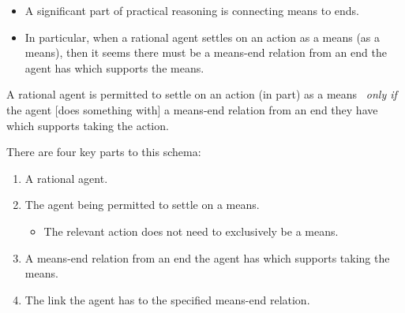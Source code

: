 \documentclass[10pt]{article}
\newenvironment{beamerblock}[1]{%
  \tcolorbox[standard,%
  no shadow,
  noparskip,
  colback=white,
  colframe=black,
  colbacktitle=white,
  coltitle=black,
  colupper=black,
  size=small,
  boxrule=.125mm,
  fonttitle=\bfseries,
  sharp corners=all,
  title=#1]}%
{\endtcolorbox}
\begin{document}
\begin{itemize}
\item A significant part of practical reasoning is connecting means to ends.
\item In particular, when a rational agent settles on an action as a means (as a means), then it seems there must be a means-end relation from an end the agent has which supports the means.
\end{itemize}

\begin{beamerblock}{Means-end schema}
  A rational agent is permitted to settle on an action (in part) as a means
  \newline
  \mbox{ }\hfill\emph{only if}\hfill\mbox{ }
  \newline
  the agent [{does something with}] a means-end relation from an end they have which supports taking the action.
\end{beamerblock}

There are four key parts to this schema:
\begin{enumerate}[label=\arabic*., ref=(\arabic*)]
\item A rational agent.
\item The agent being permitted to settle on a means.
  \begin{itemize}
  \item The relevant action does not need to exclusively be a means.
  \end{itemize}
\item A means-end relation from an end the agent has which supports taking the means.
\item The link the agent has to the specified means-end relation.
\end{enumerate}
\end{document}
